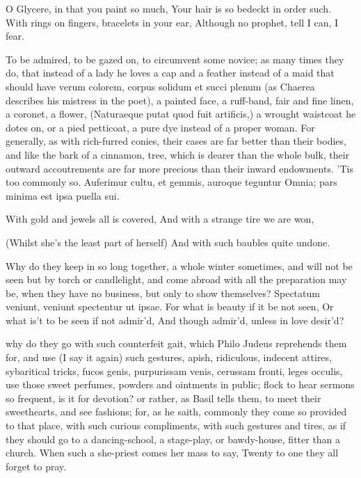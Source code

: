 {O Glycere, in that you paint so much,
Your hair is so bedeckt in order such.
With rings on fingers, bracelets in your ear,
Although no prophet, tell I can, I fear.

To be admired, to be gazed on, to circumvent some novice; as many times
they do, that instead of a lady he loves a cap and a feather instead of
a maid that should have verum colorem, corpus solidum et succi plenum
(as Chaerea describes his mistress in the poet), a painted face,
a ruff-band, fair and fine linen, a coronet, a flower,
(Naturaeque putat quod fuit artificis,) a wrought waistcoat he
dotes on, or a pied petticoat, a pure dye instead of a proper woman.
For generally, as with rich-furred conies, their cases are far better
than their bodies, and like the bark of a cinnamon, tree, which is
dearer than the whole bulk, their outward accoutrements are far more
precious than their inward endowments. 'Tis too commonly so.
Auferimur cultu, et gemmis, auroque teguntur
Omnia; pars minima est ipsa puella sui.


With gold and jewels all is covered,
And with a strange tire we are won,

(Whilst she's the least part of herself)
And with such baubles quite undone.

Why do they keep in so long together, a whole winter sometimes, and
will not be seen but by torch or candlelight, and come abroad with all
the preparation may be, when they have no business, but only to show
themselves? Spectatum veniunt, veniunt spectentur ut ipsae.
For what is beauty if it be not seen,
Or what is't to be seen if not admir'd,
And though admir'd, unless in love desir'd?

why do they go with such counterfeit gait, which Philo Judeus
reprehends them for, and use (I say it again) such gestures, apish,
ridiculous, indecent attires, sybaritical tricks, fucos genis,
purpurissam venis, cerussam fronti, leges occulis, \etc{} use those sweet
perfumes, powders and ointments in public; flock to hear sermons so
frequent, is it for devotion? or rather, as Basil tells them, to
meet their sweethearts, and see fashions; for, as he saith, commonly
they come so provided to that place, with such curious compliments,
with such gestures and tires, as if they should go to a dancing-school,
a stage-play, or bawdy-house, fitter than a church.
When such a she-priest comes her mass to say,
Twenty to one they all forget to pray.

}
